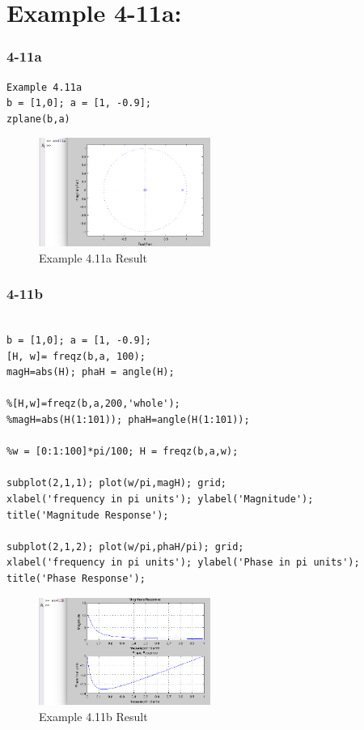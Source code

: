 \documentclass[11pt
  , a4paper
  , article
  , oneside
]{memoir}
\begin{document}
\clearpage

\chapter{Example 4-11a:}
\subsection{4-11a}
\begin{lstlisting}[style=termstyle]
Example 4.11a
b = [1,0]; a = [1, -0.9];
zplane(b,a)\end{lstlisting}

\begin{figure}[h!]
	\centering
	\includegraphics[width=0.5\textwidth,height=0.3\textwidth]{./images/ex411-a.png}
	\caption{Example 4.11a Result}
	\label{fig:Example 4.11a Result}
\end{figure}

\subsection{4-11b}
\begin{lstlisting}[style=termstyle]
%Example 4.11-b

b = [1,0]; a = [1, -0.9];
[H, w]= freqz(b,a, 100);
magH=abs(H); phaH = angle(H);

%[H,w]=freqz(b,a,200,'whole');
%magH=abs(H(1:101)); phaH=angle(H(1:101));

%w = [0:1:100]*pi/100; H = freqz(b,a,w);

subplot(2,1,1); plot(w/pi,magH); grid;
xlabel('frequency in pi units'); ylabel('Magnitude');
title('Magnitude Response');

subplot(2,1,2); plot(w/pi,phaH/pi); grid;
xlabel('frequency in pi units'); ylabel('Phase in pi units');
title('Phase Response');
\end{lstlisting}

\begin{figure}[h!]
	\centering
	\includegraphics[width=0.5\textwidth,height=0.3\textwidth]{./images/ex411b.png}
	\caption{Example 4.11b Result}
	\label{fig:Example 4.11b Result}
\end{figure}
\end{document}
